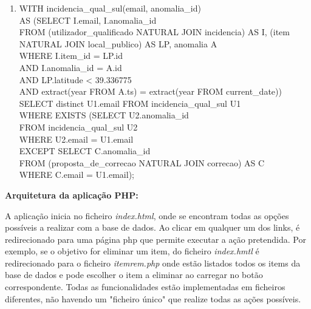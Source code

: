 \documentclass[12pt]{report}
\begin{document}
\begin{enumerate}
        \item WITH incidencia\_qual\_sul(email, anomalia\_id)\\
              AS (SELECT I.email, I.anomalia\_id \\
              FROM (utilizador\_qualificado NATURAL JOIN incidencia) AS I, (item NATURAL JOIN local\_publico) AS LP, anomalia A \\
              \hspace*{1em} WHERE I.item\_id = LP.id \\
              \hspace*{1em} AND I.anomalia\_id = A.id \\
              \hspace*{1em} AND LP.latitude < 39.336775\\
              \hspace*{1em} AND extract(year FROM A.ts) = extract(year FROM current\_date))\\
              SELECT distinct U1.email FROM incidencia\_qual\_sul U1 \\
              WHERE EXISTS (SELECT U2.anomalia\_id \\
              FROM incidencia\_qual\_sul U2 \\
              WHERE U2.email = U1.email \\
              EXCEPT SELECT C.anomalia\_id \\
              FROM (proposta\_de\_correcao NATURAL JOIN correcao) AS C \\
              WHERE C.email = U1.email);
        
    \end{enumerate}

    \vspace*{15mm}


    \Large 
    \textbf{Arquitetura da aplicação PHP:}

    \normalsize
    \vspace{2mm}

    \hspace*{1em} A aplicação inicia no ficheiro \textit{index.html}, onde se encontram todas as opções possíveis a realizar com a base de dados. Ao clicar em qualquer um dos links,
    é redirecionado para uma página php que permite executar a ação pretendida. Por exemplo, se o objetivo for eliminar um item, do ficheiro \textit{index.hmtl} é redirecionado para 
    o ficheiro \textit{itemrem.php} onde estão listados todos os items da base de dados e pode escolher o item a eliminar ao carregar no botão correspondente. Todas as funcionalidades 
    estão implementadas em ficheiros diferentes, não havendo um "ficheiro único" que realize todas as ações possíveis.\\
\end{document}
